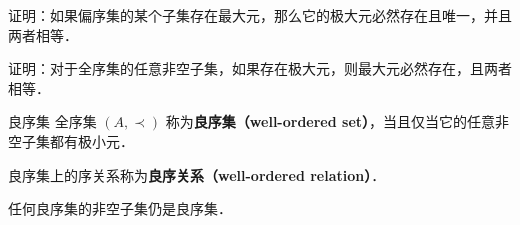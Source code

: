 \begin{exercise}{}
证明：如果偏序集的某个子集存在最大元，那么它的极大元必然存在且唯一，并且两者相等．
\end{exercise}

\begin{exercise}{}
证明：对于全序集的任意非空子集，如果存在极大元，则最大元必然存在，且两者相等．
\end{exercise}

\begin{definition}{良序集}
全序集 $(A,\prec)$ 称为\textbf{良序集（well-ordered set）}，当且仅当它的任意非空子集都有极小元．
\end{definition}

良序集上的序关系称为\textbf{良序关系（well-ordered relation）}．

任何良序集的非空子集仍是良序集．